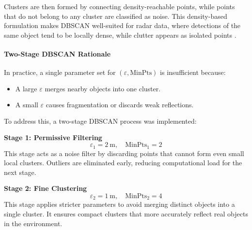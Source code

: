 \vspace{2\baselineskip}

Clusters are then formed by connecting density-reachable points, while points that do not belong to any cluster are classified as noise.  
This density-based formulation makes DBSCAN well-suited for radar data, where detections of the same object tend to be locally dense, while clutter appears as isolated points \cite{OccupancyGrid_Mapping_Automotive}.

\paragraph{Two-Stage DBSCAN Rationale}
In practice, a single parameter set for $(\varepsilon, \text{MinPts})$ is insufficient because:
\begin{itemize}
    \item A large $\varepsilon$ merges nearby objects into one cluster.
    \item A small $\varepsilon$ causes fragmentation or discards weak reflections.
\end{itemize}

To address this, a two-stage DBSCAN process was implemented:

\textbf{Stage 1: Permissive Filtering}
\begin{equation}
    \varepsilon_1 = \SI{2}{\meter}, \quad \text{MinPts}_1 = 2
\end{equation}
This stage acts as a noise filter by discarding points that cannot form even small local clusters.  
Outliers are eliminated early, reducing computational load for the next stage.

\textbf{Stage 2: Fine Clustering}
\begin{equation}
    \varepsilon_2 = \SI{1}{\meter}, \quad \text{MinPts}_2 = 4
\end{equation}
This stage applies stricter parameters to avoid merging distinct objects into a single cluster.  
It ensures compact clusters that more accurately reflect real objects in the environment.

